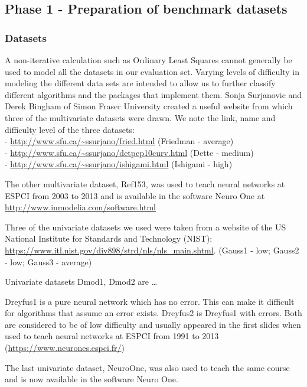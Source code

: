 \hypertarget{phase-1---preparation-of-benchmark-datasets}{%
\subsection{Phase 1 - Preparation of benchmark
datasets}\label{phase-1---preparation-of-benchmark-datasets}}

\hypertarget{datasets}{%
\subsubsection{Datasets}\label{datasets}}

A non-iterative calculation such as Ordinary Least Squares cannot
generally be used to model all the datasets in our evaluation set.
Varying levels of difficulty in modeling the different data sets are
intended to allow us to further classify different algorithms and the
packages that implement them. Sonja Surjanovic and Derek Bingham of
Simon Fraser University created a useful website from which three of the
multivariate datasets were drawn. We note the link, name and difficulty
level of the three datasets:\\
- \url{http://www.sfu.ca/~ssurjano/fried.html} (Friedman - average)\\
- \url{http://www.sfu.ca/~ssurjano/detpep10curv.html} (Dette - medium)\\
- \url{http://www.sfu.ca/~ssurjano/ishigami.html} (Ishigami - high)

The other multivariate dataset, Ref153, was used to teach neural
networks at ESPCI from 2003 to 2013 and is available in the software
Neuro One at \url{http://www.inmodelia.com/software.html}

Three of the univariate datasets we used were taken from a website of
the US National Institute for Standards and Technology (NIST):
\url{https://www.itl.nist.gov/div898/strd/nls/nls_main.shtml}. (Gauss1 -
low; Gauss2 - low; Gauss3 - average)

Univariate datasets Dmod1, Dmod2 are \ldots{}

Dreyfus1 is a pure neural network which has no error. This can make it
difficult for algorithms that assume an error exists. Dreyfus2 is
Dreyfus1 with errors. Both are considered to be of low difficulty and
usually appeared in the first slides when used to teach neural networks
at ESPCI from 1991 to 2013 (\url{https://www.neurones.espci.fr/})

The last univariate dataset, NeuroOne, was also used to teach the same
course and is now available in the software Neuro One.

